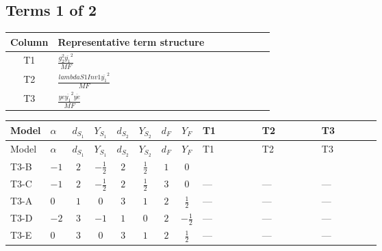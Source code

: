 \documentclass[8pt]{article}
\begin{document}
\begin{landscape}
\subsection*{Terms 1 of 2}
\begin{center}
\begin{tabular}{@{}c >{\raggedright\arraybackslash}p{0.82\linewidth}@{}}
\toprule
Column & Representative term structure \\
\midrule
T1 & \(\displaystyle \frac{g_{2}^{2} \overline{y_{1}}^{2}}{MF}\) \\
\midrule
T2 & \(\displaystyle \frac{lambdaS1Inv1 \overline{y_{1}}^{2}}{MF}\) \\
\midrule
T3 & \(\displaystyle \frac{ye \overline{y_{1}}^{2} \overline{ye}}{MF}\) \\
\midrule
\bottomrule
\end{tabular}
\end{center}
\smallskip
\tiny
\begin{longtable}{@{}llcccccc >{\raggedright\arraybackslash}p{0.21\linewidth} >{\raggedright\arraybackslash}p{0.21\linewidth} >{\raggedright\arraybackslash}p{0.21\linewidth}@{}}
\toprule
Model & $\alpha$ & $d_{S_1}$ & $Y_{S_1}$ & $d_{S_2}$ & $Y_{S_2}$ & $d_F$ & $Y_F$ & T1 & T2 & T3 \\
\midrule
\endfirsthead
\toprule
Model & $\alpha$ & $d_{S_1}$ & $Y_{S_1}$ & $d_{S_2}$ & $Y_{S_2}$ & $d_F$ & $Y_F$ & T1 & T2 & T3 \\
\midrule
\endhead
T3-B & $-1$ & $2$ & $-\frac{1}{2}$ & $2$ & $\frac{1}{2}$ & $1$ & $0$ & \scriptsize\adjustbox{max width=\linewidth}{$\begin{gathered} - \frac{3 g_{2}^{2} \overline{y_{1}}^{2}}{4 MF}\end{gathered}$} & \scriptsize\adjustbox{max width=\linewidth}{$\begin{gathered} - \frac{lambdaS1Inv1 \overline{y_{1}}^{2}}{2 MF}\end{gathered}$} & \scriptsize\adjustbox{max width=\linewidth}{$\begin{gathered} \frac{ye \overline{y_{1}}^{2} \overline{ye}}{4 MF}\end{gathered}$} \\
\midrule
T3-C & $-1$ & $2$ & $-\frac{1}{2}$ & $2$ & $\frac{1}{2}$ & $3$ & $0$ & --- & --- & --- \\
\midrule
T3-A & $0$ & $1$ & $0$ & $3$ & $1$ & $2$ & $\frac{1}{2}$ & --- & --- & --- \\
\midrule
T3-D & $-2$ & $3$ & $-1$ & $1$ & $0$ & $2$ & $-\frac{1}{2}$ & --- & --- & --- \\
\midrule
T3-E & $0$ & $3$ & $0$ & $3$ & $1$ & $2$ & $\frac{1}{2}$ & --- & --- & --- \\
\midrule
\bottomrule
\end{longtable}
\clearpage

\end{landscape}
\end{document}
